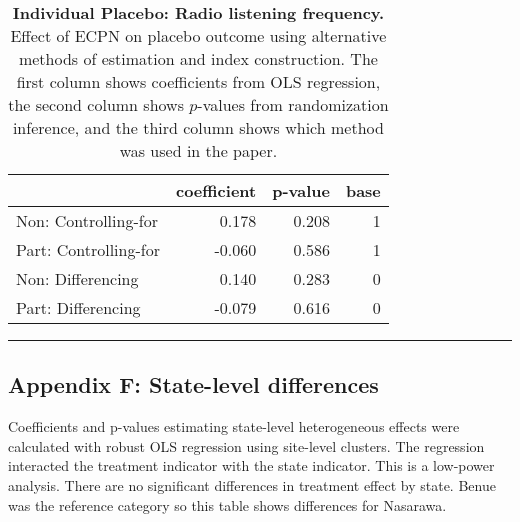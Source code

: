 \documentclass[
]{article}
\begin{document}
\begin{table}[H]
\begin{center}
\label{tab:pl_rad_ind}
\caption{\textbf{Individual Placebo: Radio listening frequency.} Effect of ECPN on placebo outcome using alternative methods of estimation and index construction. The first column shows coefficients from OLS regression, the second column shows $p$-values from randomization inference, and the third column shows which method was used in the paper.}
\smallskip

\begin{tabular}{l|r|r|r}
\hline
  & coefficient & p-value & base\\
\hline
Non: Controlling-for & 0.178 & 0.208 & 1\\
\hline
Part: Controlling-for & -0.060 & 0.586 & 1\\
\hline
Non: Differencing & 0.140 & 0.283 & 0\\
\hline
Part: Differencing & -0.079 & 0.616 & 0\\
\hline
\end{tabular}


\end{center}
\end{table}

\begin{center}\rule{0.5\linewidth}{0.5pt}\end{center}

\hypertarget{appendix-f-state-level-differences}{%
\subsection{Appendix F: State-level
differences}\label{appendix-f-state-level-differences}}

Coefficients and p-values estimating state-level heterogeneous effects
were calculated with robust OLS regression using site-level clusters.
The regression interacted the treatment indicator with the state
indicator. This is a low-power analysis. There are no significant
differences in treatment effect by state. Benue was the reference
category so this table shows differences for Nasarawa.
\end{document}
